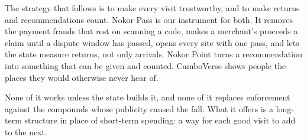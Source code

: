 \documentclass[10pt,letterpaper,twocolumn]{article}
\begin{document}
The strategy that follows is to make every visit trustworthy, and to make
returns and recommendations count. Nokor Pass is our instrument for both. It
removes the payment frauds that rest on scanning a code, makes a merchant's
proceeds a claim until a dispute window has passed, opens every site with one
pass, and lets the state measure returns, not only arrivals. Nokor Point turns
a recommendation into something that can be given and counted. CamboVerse shows
people the places they would otherwise never hear of.

None of it works unless the state builds it, and none of it replaces
enforcement against the compounds whose publicity caused the fall. What it
offers is a long-term structure in place of short-term spending: a way for each
good visit to add to the next.

\small


\end{document}
